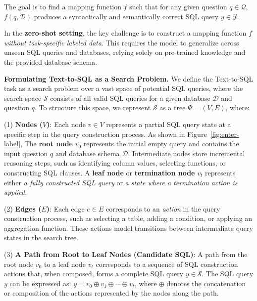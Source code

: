 The goal is to find a mapping function $f$ such that for any given question $q \in \mathcal{Q}$, $f(q, \mathcal{D})$ produces a syntactically and semantically correct SQL query $y \in \mathcal{Y}$. %


In the \textbf{zero-shot setting}, the key challenge is to construct a mapping function $f$ \textit{without task-specific labeled data}. This requires the model to generalize across unseen SQL queries and databases, relying solely on pre-trained knowledge and the provided database schema. 

\textbf{Formulating Text-to-SQL as a Search Problem.}
We define the Text-to-SQL task as a search problem over a vast space of potential SQL queries, where the search space $\mathcal{S}$ consists of all valid SQL queries for a given database $\mathcal{D}$ and question $q$. To structure this space, we represent $\mathcal{S}$ as a tree $\Psi = (V, E)$, where:

(1) \textbf{Nodes ($V$)}: Each node $v \in V$ represents a partial SQL query state at a specific step in the query construction process. As shown in Figure~\ref{fig:enter-label}, The \textbf{root node} $v_0$ represents the initial empty query and contains the input question $q$ and database schema $\mathcal{D}$.
Intermediate nodes store incremental reasoning steps, such as identifying column values, selecting functions, or constructing SQL clauses.
A \textbf{leaf node} or \textbf{termination node} $v_t$ represents either \textit{a fully constructed SQL query} or  \textit{a state where a termination action is applied}.

(2) \textbf{Edges ($E$)}: Each edge $e \in E$ corresponds to an \textit{action} in the query construction process, such as selecting a table, adding a condition, or applying an aggregation function. These actions model transitions between intermediate query states in the search tree.

(3) \textbf{A Path from Root to Leaf Nodes (Candidate SQL)}: A path from the root node $v_0$ to a leaf node $v_t$ corresponds to a sequence of SQL construction actions that, when composed, forms a complete SQL query $y \in \mathcal{S}$. The SQL query $y$ can be expressed as: $y = v_0 \oplus v_1 \oplus \cdots \oplus v_t$, where $\oplus$ denotes the concatenation or composition of the actions represented by the nodes along the path.

